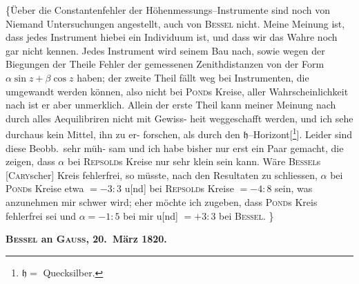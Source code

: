 \documentclass[12pt,a4paper]{article}
\theoremstyle{plain}
\theoremstyle{definition}
\theoremstyle{remark}
\begin{document}
\medskip
\{\"{U}eber die Constantenfehler der H\"{o}henmessungs--Instrumente
sind noch von Niemand Untersuchungen angestellt, auch von \textsc{Bessel} nicht.
Meine Meinung ist, dass jedes Instrument hiebei ein Individuum ist, und
dass wir das Wahre noch gar nicht kennen. Jedes Instrument wird seinem
Bau nach, sowie wegen der Biegungen der Theile Fehler der gemessenen
Zenithdistanzen von der Form $\alpha \sin z + \beta \cos z$ haben; der zweite Theil f\"{a}llt
weg bei Instrumenten, die umgewandt werden k\"{o}nnen, also nicht bei \textsc{Pond}s
Kreise, aller Wahrscheinlichkeit nach ist er aber unmerklich. Allein der erste
Theil kann meiner Meinung nach durch alles Aequilibriren nicht mit Gewiss-
heit weggeschafft werden, und ich sehe durchaus kein Mittel, ihn zu er-
forschen, als durch den $\mathfrak{h}$--Horizont[\footnote{$\mathfrak{h} =$ Quecksilber.}]. Leider sind diese Beobb.\ sehr m\"{u}h-
sam und ich habe bisher nur erst ein Paar gemacht, die zeigen, dass $\alpha$ bei
\textsc{Repsold}s Kreise nur sehr klein sein kann. W\"{a}re \textsc{Bessel}s [\textsc{Cary}scher] Kreis
fehlerfrei, so m\"{u}sste, nach den Resultaten zu schliessen, $\alpha$ bei \textsc{Pond}s Kreise
etwa $= -3\!\!:\!\!3$ u[nd] bei \textsc{Repsold}s Kreise $= -4\!\!:\!\!8$ sein, was anzunehmen mir
schwer wird; eher m\"{o}chte ich zugeben, dass \textsc{Pond}s Kreis fehlerfrei sei und
$\alpha = -1\!\!:\!\!5$ bei mir u[nd] $= +3\!\!:\!\!3$ bei \textsc{Bessel}. \dotfill\}

\medskip
\begin{center}
\textbf{\textsc{Bessel} an \textsc{Gauss}, 20.\ M\"{a}rz 1820.}
\end{center}
\end{document}

